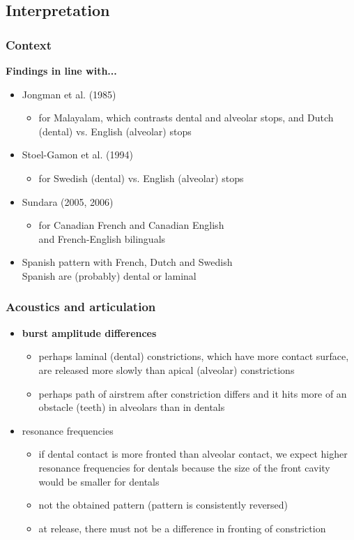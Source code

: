 \documentclass{beamer}
\begin{document}
\subsection{Interpretation}

\begin{frame}
\frametitle{Context}
\textbf{Findings in line with...}
\begin{itemize}
	\item Jongman et al. (1985) \begin{itemize} \item for Malayalam, which contrasts dental and alveolar stops, and Dutch (dental) vs. English (alveolar) stops \end{itemize}
	\item Stoel-Gamon et al. (1994) \begin{itemize} \item for Swedish (dental) vs. English (alveolar) stops \end{itemize}
	\item Sundara (2005, 2006) \begin{itemize} \item for Canadian French and Canadian English \\ and French-English bilinguals\end{itemize}
	\item Spanish  pattern with French, Dutch and Swedish \\ \alert{Spanish  are (probably) dental or laminal}
\end{itemize}
\end{frame}

\begin{frame}
\frametitle{Acoustics and articulation}
\begin{itemize}
	\item \textbf{burst amplitude differences}
	\begin{itemize}
		\item perhaps laminal (dental) constrictions, which have more contact surface, are released more slowly than apical (alveolar) constrictions
		\item perhaps path of airstrem after constriction differs and it hits more of an obstacle (teeth) in alveolars than in dentals
	\end{itemize}
	\item resonance frequencies
	\begin{itemize}
		\item if dental contact is more fronted than alveolar contact, we expect higher resonance frequencies for dentals because the size of the front cavity would be smaller for dentals
		\item not the obtained pattern (pattern is consistently reversed)
		\item at release, there must not be a difference in fronting of constriction
	\end{itemize}
\end{itemize}
\end{frame}
\end{document}
